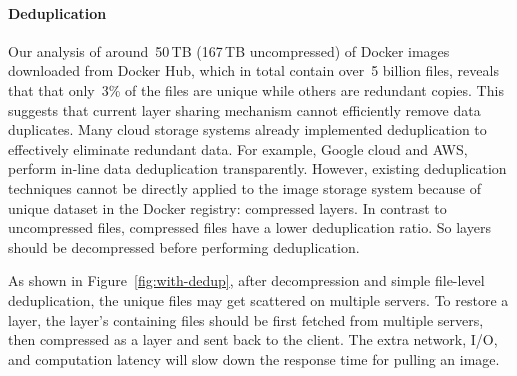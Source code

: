 \paragraph{Deduplication}
Our analysis of around~50\,TB (167\,TB uncompressed) of Docker images downloaded from Docker Hub,
which in total contain over~5 billion files, reveals that
that only~3\% of the files are unique while others are redundant copies. 
This suggests that current layer sharing mechanism cannot efficiently remove data duplicates.
Many cloud storage systems already implemented deduplication to effectively eliminate redundant data.
For example,
Google cloud and AWS, 
perform in-line data deduplication transparently.
However, existing deduplication techniques cannot be directly applied to the image storage system 
because of unique dataset in the Docker registry: compressed layers. 
In contrast to uncompressed files, compressed files have a lower deduplication ratio. 
So layers should be decompressed before performing deduplication.

As shown in Figure~\ref{fig:with-dedup}, 
after decompression and simple file-level deduplication, the unique files may get scattered on
multiple servers. 
To restore a layer,
the layer's containing files should be first fetched from multiple servers, then compressed as a layer
and sent back to the client.
The extra network, I/O, and computation latency will slow down the response time for pulling an image.


 
